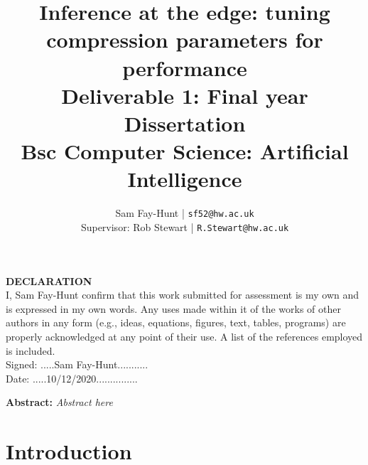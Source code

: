 \documentclass[11pt]{article}
\begin{document}
\title{%
	\bf Inference at the edge: tuning compression parameters for performance\\ 
	\large Deliverable 1: Final year Dissertation \\
	Bsc Computer Science: Artificial Intelligence}

\author{
	Sam Fay-Hunt | \texttt{sf52@hw.ac.uk}\\
	Supervisor: Rob Stewart | \texttt{R.Stewart@hw.ac.uk}
}

\maketitle
\thispagestyle{empty}
\pagebreak

\textbf{DECLARATION}\\
I, Sam Fay-Hunt confirm that this work submitted for assessment is my own and is expressed in
my own words. Any uses made within it of the works of other authors in any form (e.g., ideas,
equations, figures, text, tables, programs) are properly acknowledged at any point of their
use. A list of the references employed is included.\\
Signed: .....Sam Fay-Hunt...........\\
Date: .....10/12/2020...............
\thispagestyle{empty}
\pagebreak

\textbf{Abstract:} 
\emph{Abstract here}



\thispagestyle{empty}
\pagebreak

\tableofcontents
\thispagestyle{empty}
\pagebreak

\printnoidxglossary[type=acronym, nonumberlist]
\thispagestyle{empty}

\newpage
\setcounter{page}{1}

\section{Introduction}
%



\pagebreak
\end{document}
